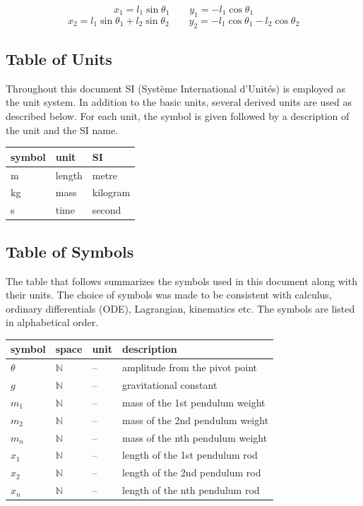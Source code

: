 \documentclass[12pt]{article}
\begin{document}
$$x_1 = l_1 \sin\theta_1 \quad\quad y_1 = -l_1 \cos\theta_1$$
$$x_2 = l_1 \sin\theta_1 + l_2 \sin\theta_2 \quad\quad y_2 = -l_1\cos\theta_1 -l_2\cos\theta_2$$


\subsection{Table of Units}

Throughout this document SI (Syst\`{e}me International d'Unit\'{e}s) is employed 
as the unit system.  In addition to the basic units, several derived units are
used as described below.  For each unit, the symbol is given followed by a
description of the unit and the SI name.\\

\renewcommand{\arraystretch}{1.2}
  \noindent \begin{tabular}{l l l} 
    \toprule		
    \textbf{symbol} & \textbf{unit} & \textbf{SI}\\
    \midrule 
    \si{\metre} & length & metre\\
    \si{\kilogram} & mass & kilogram\\
    \si{\second} & time & second\\
    \bottomrule
  \end{tabular}

\newpage

\subsection{Table of Symbols}

The table that follows summarizes the symbols used in this document along with
their units.  The choice of symbols was made to be consistent with calculus, ordinary differentials (ODE), Lagrangian, kinematics etc.  The symbols are listed in alphabetical order.
~\newline
\renewcommand{\arraystretch}{1.2}
\noindent \begin{longtable*}{l l l p{8cm}} \toprule
\textbf{symbol} & \textbf{space} & \textbf{unit} & \textbf{description}\\
\midrule 
$\theta$ & $\mathbb{N}$ & -- & amplitude from the pivot point
\\
$g$ & $\mathbb{N}$ & -- & gravitational constant
\\
$m_1$ & $\mathbb{N}$ & -- & mass of the 1st pendulum weight
\\ 
$m_2$ & $\mathbb{N}$ & -- & mass of the 2nd pendulum weight
\\ 
$m_n$ & $\mathbb{N}$ & -- & mass of the nth pendulum weight
\\ 
$x_1$ & $\mathbb{N}$ & -- & length of the 1st pendulum rod
\\ 
$x_2$ & $\mathbb{N}$ & -- & length of the 2nd pendulum rod
\\ 
$x_n$ & $\mathbb{N}$ & -- & length of the nth pendulum rod
\\
\bottomrule
\end{longtable*}
\end{document}
